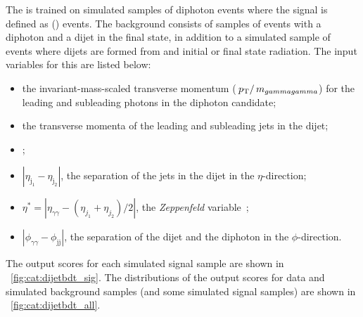 The \DiJetBdt is trained on simulated samples of diphoton events where the signal is defined as \VBF (\Hgg) events. The background consists of samples of \SM events with a diphoton and a dijet in the final state, in addition to a simulated sample of \ggH events where dijets are formed from \PU and initial or final state radiation. The input variables for this \BDT are listed below:
\begin{itemize}
\item the invariant-mass-scaled transverse momentum ($\,p_\text{T}/\,m_{gammagamma}$) for the leading and subleading photons in the diphoton candidate;
\item the transverse momenta of the leading and subleading jets in the dijet;
\item \mjj;
\item $|\eta_{\text{j}_1} - \eta_{\text{j}_2}|$, the separation of the jets in the dijet in the $\eta$-direction;
\item $\eta^{*} = |\eta_{\gamma\gamma} - (\eta_{j_1}+\eta_{j_2})/2|$, the \emph{Zeppenfeld} variable~\cite{Zeppenfeld};
\item $|\phi_{\gamma\gamma} - \phi_\text{jj}|$, the separation of the dijet and the diphoton in the $\phi$-direction.
\end{itemize}

The \DiJetBdt output scores for each simulated signal sample are shown in \Fig~\ref{fig:cat:dijetbdt_sig}. The distributions of the \DiJetBdt output scores for data and simulated background samples (and some simulated signal samples) are shown in \Fig~\ref{fig:cat:dijetbdt_all}. 

